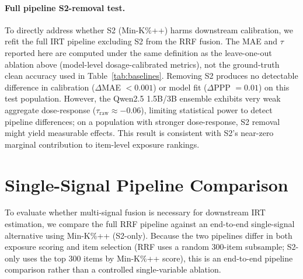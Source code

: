 \paragraph{Full pipeline S2-removal test.}
To directly address whether S2 (Min-K\%++) harms downstream calibration, we refit the full IRT pipeline excluding S2 from the RRF fusion. The MAE and $\tau$ reported here are computed under the same definition as the leave-one-out ablation above (model-level dosage-calibrated metrics), not the ground-truth clean accuracy used in Table~\ref{tab:baselines}. Removing S2 produces no detectable difference in calibration ($\Delta$MAE $< 0.001$) or model fit ($\Delta$PPP $= 0.01$) on this test population. However, the Qwen2.5 1.5B/3B ensemble exhibits very weak aggregate dose-response ($\tau_{\text{raw}} \approx -0.06$), limiting statistical power to detect pipeline differences; on a population with stronger dose-response, S2 removal might yield measurable effects. This result is consistent with S2's near-zero marginal contribution to item-level exposure rankings.

\section{Single-Signal Pipeline Comparison}
\label{sec:s2_only_pipeline}

To evaluate whether multi-signal fusion is necessary for downstream IRT estimation, we compare the full RRF pipeline against an end-to-end single-signal alternative using Min-K\%++ (S2-only). Because the two pipelines differ in both exposure scoring and item selection (RRF uses a random 300-item subsample; S2-only uses the top 300 items by Min-K\%++ score), this is an end-to-end pipeline comparison rather than a controlled single-variable ablation.

\begin{table}[h]
\centering
\caption{End-to-end pipeline comparison: RRF (multi-signal, random 300 items) vs.\ S2-only (Min-K\%++, top-300). Qwen2.5, $J\!=\!16$.}
\label{tab:s1_pipeline}
\footnotesize
{}
\end{table}

